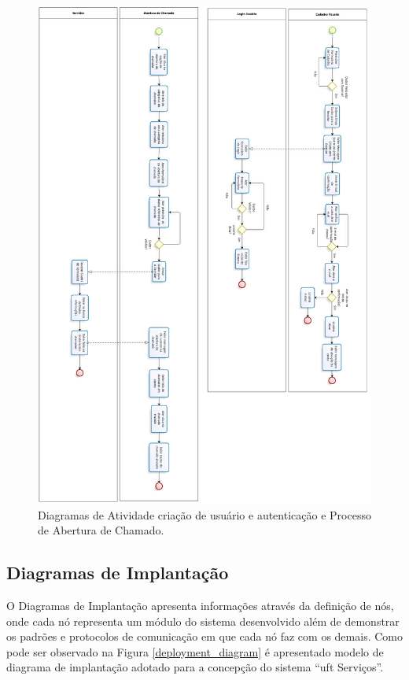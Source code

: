 \begin{figure}[H]
 \centering
 \includegraphics[width=1\textwidth]{figuras/atividade} 
 \caption{Diagramas de Atividade criação de usuário e autenticação e Processo de Abertura de Chamado.}
 \label{diagram-atividade} 
\end{figure}

\subsection*{Diagramas de Implantação}

\noindent O Diagramas de Implantação apresenta informações através da definição de nós, onde cada nó representa um módulo do sistema desenvolvido além de demonstrar os padrões e protocolos de comunicação em que cada nó faz com os demais. Como pode ser observado na Figura \ref{deployment_diagram} é apresentado modelo de diagrama de implantação adotado para a concepção do sistema ``\acrshort{uft} Serviços''.

